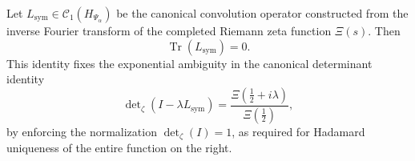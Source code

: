 \begin{theorem}
\label{thm:trace-zero-Lsym}
Let \( L_{\mathrm{sym}} \in \mathcal{C}_1(H_{\Psi_\alpha}) \) be the canonical convolution operator constructed from the inverse Fourier transform of the completed Riemann zeta function \( \Xi(s) \). Then
\[
\operatorname{Tr}(L_{\mathrm{sym}}) = 0.
\]
This identity fixes the exponential ambiguity in the canonical determinant identity
\[
\det\nolimits_{\zeta}(I - \lambda L_{\mathrm{sym}}) = \frac{\Xi(\tfrac{1}{2} + i\lambda)}{\Xi(\tfrac{1}{2})},
\]
by enforcing the normalization \( \det_{\zeta}(I) = 1 \), as required for Hadamard uniqueness of the entire function on the right.
\end{theorem}
